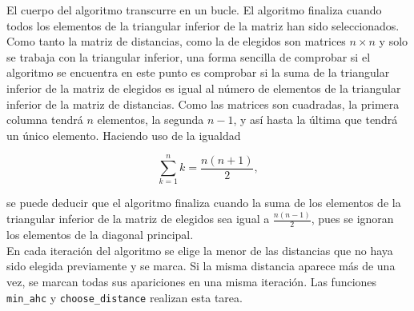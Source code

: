 \documentclass[12pt]{report}\usepackage[]{graphicx}\usepackage[dvipsnames]{xcolor}
\begin{document}
		 		El cuerpo del algoritmo transcurre en un bucle. El algoritmo finaliza cuando todos los elementos de la triangular inferior de la matriz han sido seleccionados. Como tanto la matriz de distancias, como la de elegidos son matrices $n \times n$ y solo se trabaja con la triangular inferior, una forma sencilla de comprobar si el algoritmo se encuentra en este punto es comprobar si la suma de la triangular inferior de la matriz de elegidos es igual al número de elementos de la triangular inferior de la matriz de distancias. Como las matrices son cuadradas, la primera columna tendrá $n$ elementos, la segunda $n-1$, y así hasta la última que tendrá un único elemento. Haciendo uso de la igualdad
		 		
		 		$$
		 		\sum_{k=1}^n k = \frac{n(n+1)}{2}, 
		 		$$ 
		 		
		 		\noindent se puede deducir que el algoritmo finaliza cuando la suma de los elementos de la triangular inferior de la matriz de elegidos sea igual a $\frac{n(n-1)}{2}$, pues se ignoran los elementos de la diagonal principal. \\
		 		
		 		En cada iteración del algoritmo se elige la menor de las distancias que no haya sido elegida previamente y se marca. Si la misma distancia aparece más de una vez, se marcan todas sus apariciones en una misma iteración. Las funciones \texttt{min\_ahc} y \texttt{choose\_distance} realizan esta tarea. 
		 		
\end{document}
